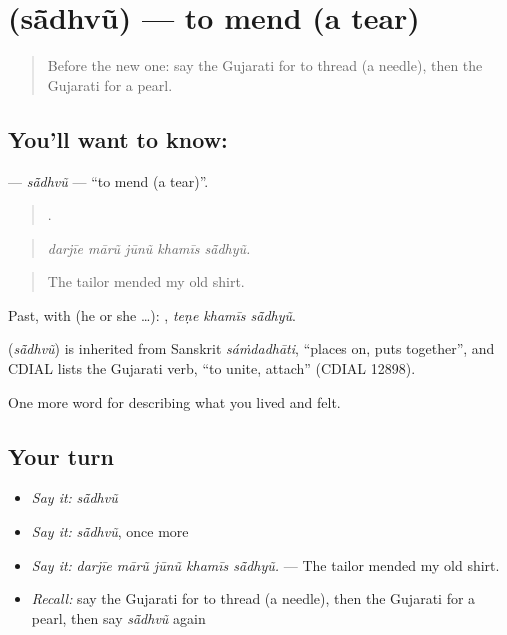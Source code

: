 \section[\texorpdfstring{\gu{સાંધવું} (sā̃dhvũ)}{સાંધવું (sā̃dhvũ)}]{ (sā̃dhvũ) — to mend (a tear)}

\label{lesson:GU-C507-sandhvu}



\begin{quote}
Before the new one: say the Gujarati for to thread (a needle), then the Gujarati for a pearl.
\end{quote}

\subsection*{You'll want to know: }
\textbf{} — \emph{sā̃dhvũ} — \textquotedblleft{}to mend (a tear)\textquotedblright{}.

\begin{quote}
    .
\end{quote}

\begin{quote}
\emph{darjīe mārũ jūnũ khamīs sā̃dhyũ.}
\end{quote}

\begin{quote}
The tailor mended my old shirt.
\end{quote}

Past, with  (he or she …):   , \emph{teṇe khamīs sā̃dhyũ}.

\begin{cousinweb}
\textbf{} (\emph{sā̃dhvũ}) is inherited from Sanskrit \emph{sáṁdadhāti}, \textquotedblleft{}places on, puts together\textquotedblright{}, and CDIAL lists the Gujarati verb, \textquotedblleft{}to unite, attach\textquotedblright{} (CDIAL 12898).
\end{cousinweb}

\begin{grammarlens}[title={What you've built}]
One more word for describing what you lived and felt.
\end{grammarlens}

\subsection*{Your turn}
\begin{itemize}
\raggedright
  \item \emph{Say it:} \emph{sā̃dhvũ}
  \item \emph{Say it:} \emph{sā̃dhvũ}, once more
  \item \emph{Say it:} \emph{darjīe mārũ jūnũ khamīs sā̃dhyũ.} — The tailor mended my old shirt.
  \item \emph{Recall:} say the Gujarati for to thread (a needle), then the Gujarati for a pearl, then say \emph{sā̃dhvũ} again
\end{itemize}


